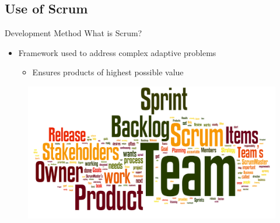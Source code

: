 \subsection{Use of Scrum}
\begin{frame}{Development Method}
  What is Scrum?
  \linespace

  \begin{itemize}
  \item Framework used to address complex adaptive problems
    \begin{itemize}
    \item Ensures products of highest possible value
    \end{itemize}
  \end{itemize}

	\begin{figure}
		\includegraphics[width=1\textwidth]{slides/agile-glossary.png}
	\end{figure}
\end{frame}

